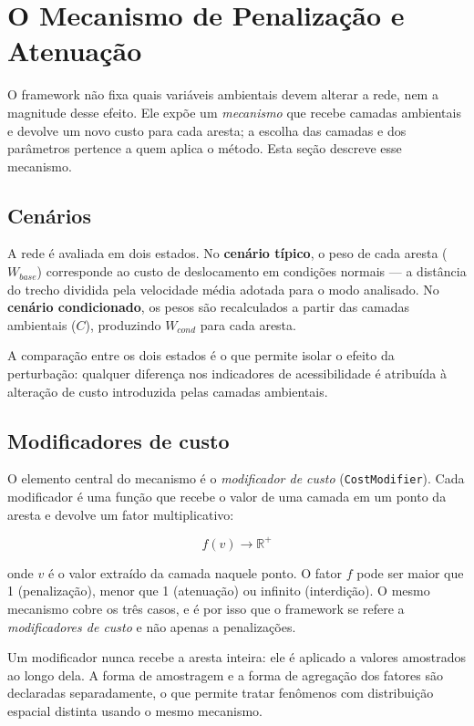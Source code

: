\section{O Mecanismo de Penalização e Atenuação}
\label{sec:penalization}

O framework não fixa quais variáveis ambientais devem alterar a rede, nem a
magnitude desse efeito. Ele expõe um \emph{mecanismo} que recebe camadas
ambientais e devolve um novo custo para cada aresta; a escolha das camadas e dos
parâmetros pertence a quem aplica o método. Esta seção descreve esse mecanismo.

\subsection{Cenários}

A rede é avaliada em dois estados. No \textbf{cenário típico}, o peso de cada
aresta ($W_{base}$) corresponde ao custo de deslocamento em condições normais —
a distância do trecho dividida pela velocidade média adotada para o modo
analisado. No \textbf{cenário condicionado}, os pesos são recalculados a partir
das camadas ambientais ($C$), produzindo $W_{cond}$ para cada aresta.

A comparação entre os dois estados é o que permite isolar o efeito da
perturbação: qualquer diferença nos indicadores de acessibilidade é atribuída à
alteração de custo introduzida pelas camadas ambientais.

\subsection{Modificadores de custo}

O elemento central do mecanismo é o \emph{modificador de custo}
(\texttt{CostModifier}). Cada modificador é uma função que recebe o valor de uma
camada em um ponto da aresta e devolve um fator multiplicativo:

\begin{equation}
  f(v) \rightarrow \mathbb{R}^{+}
\end{equation}

onde $v$ é o valor extraído da camada naquele ponto. O fator $f$ pode ser maior
que 1 (penalização), menor que 1 (atenuação) ou infinito (interdição). O mesmo
mecanismo cobre os três casos, e é por isso que o framework se refere a
\emph{modificadores de custo} e não apenas a penalizações.

Um modificador nunca recebe a aresta inteira: ele é aplicado a valores amostrados
ao longo dela. A forma de amostragem e a forma de agregação dos fatores são
declaradas separadamente, o que permite tratar fenômenos com distribuição
espacial distinta usando o mesmo mecanismo.

